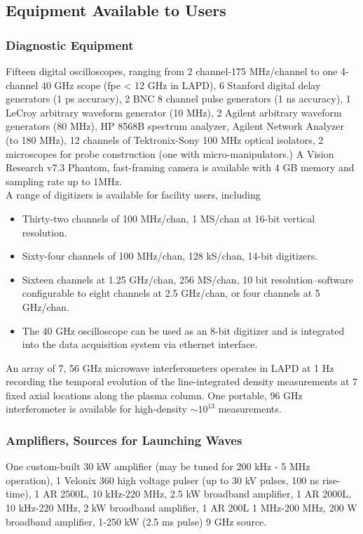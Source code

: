 \documentclass[11pt]{article}
\begin{document}
\pagebreak
\subsection{Equipment Available to Users}

\subsubsection{Diagnostic Equipment}
Fifteen digital oscilloscopes, ranging from 2 channel-175 MHz/channel to one 4-channel 40 GHz scope (fpe < 12 GHz in LAPD), 6 Stanford digital delay generators (1 ps accuracy), 2 BNC 8 channel pulse generators (1 ns accuracy), 1 LeCroy arbitrary waveform generator (10 MHz), 2 Agilent arbitrary waveform generators (80 MHz), HP 8568B spectrum analyzer, Agilent Network Analyzer (to 180 MHz), 12 channels of Tektronix-Sony 100 MHz optical isolators, 2 microscopes for probe construction (one with micro-manipulators.) A Vision Research v7.3 Phantom, fast-framing camera is available with 4 GB memory and sampling rate up to 1MHz.\\
	A range of digitizers is available for facility users, including
\begin{itemize}
\item Thirty-two channels of 100 MHz/chan, 1 MS/chan at 16-bit vertical resolution.
\item Sixty-four  channels of 100 MHz/chan, 128 kS/chan, 14-bit digitizers.
\item Sixteen channels at 1.25 GHz/chan, 256 MS/chan, 10 bit resolution--software configurable  to eight channels at 2.5 GHz/chan, or four channels at 5 GHz/chan.

\item The 40 GHz oscilloscope can be used as an 8-bit digitizer and is integrated into the data acquisition system via ethernet interface.
\end{itemize}
	An array of 7, 56 GHz microwave interferometers operates in LAPD at 1 Hz recording the temporal evolution of the line-integrated density measurements at 7 fixed axial locations along the plasma column. One portable, 96 GHz interferometer is available for high-density $ \sim 10^{13}$ measurements.

\subsubsection{Amplifiers, Sources for Launching Waves}
One custom-built 30 kW amplifier (may be tuned for 200 kHz - 5 MHz operation), 1 Velonix 360 high voltage pulser (up to 30 kV pulses, 100 ns rise-time), 1 AR 2500L, 10 kHz-220 MHz, 2.5 kW broadband amplifier, 1 AR 2000L, 10 kHz-220 MHz, 2 kW broadband amplifier, 1 AR 200L 1 MHz-200 MHz, 200 W broadband amplifier, 1-250 kW (2.5 ms pulse) 9 GHz source.
\end{document}

